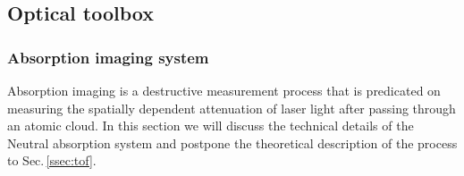 %
%
%

\pagebreak
\subsection{Optical toolbox} \label{ssec:op_tools}
\subsubsection{Absorption imaging system} \label{sec:absImagingTech}
Absorption imaging is a destructive measurement process that is predicated on measuring the spatially dependent attenuation of laser light after passing through an atomic cloud. 
In this section we will discuss the technical details of the Neutral absorption system and postpone the theoretical description of the process to Sec.\,\ref{ssec:tof}.

